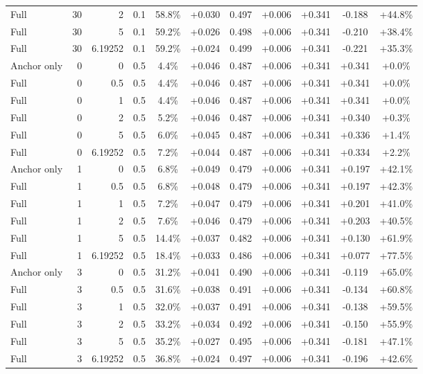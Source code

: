 \begin{table}[htbp]
\begin{tabular}{lrrrccccccc}
Full & 30 & 2 & 0.1 & 58.8\% & +0.030 & 0.497 & +0.006 & +0.341 & -0.188 & +44.8\% \\
Full & 30 & 5 & 0.1 & 59.2\% & +0.026 & 0.498 & +0.006 & +0.341 & -0.210 & +38.4\% \\
Full & 30 & 6.19252 & 0.1 & 59.2\% & +0.024 & 0.499 & +0.006 & +0.341 & -0.221 & +35.3\% \\
Anchor only & 0 & 0 & 0.5 & 4.4\% & +0.046 & 0.487 & +0.006 & +0.341 & +0.341 & +0.0\% \\
Full & 0 & 0.5 & 0.5 & 4.4\% & +0.046 & 0.487 & +0.006 & +0.341 & +0.341 & +0.0\% \\
Full & 0 & 1 & 0.5 & 4.4\% & +0.046 & 0.487 & +0.006 & +0.341 & +0.341 & +0.0\% \\
Full & 0 & 2 & 0.5 & 5.2\% & +0.046 & 0.487 & +0.006 & +0.341 & +0.340 & +0.3\% \\
Full & 0 & 5 & 0.5 & 6.0\% & +0.045 & 0.487 & +0.006 & +0.341 & +0.336 & +1.4\% \\
Full & 0 & 6.19252 & 0.5 & 7.2\% & +0.044 & 0.487 & +0.006 & +0.341 & +0.334 & +2.2\% \\
Anchor only & 1 & 0 & 0.5 & 6.8\% & +0.049 & 0.479 & +0.006 & +0.341 & +0.197 & +42.1\% \\
Full & 1 & 0.5 & 0.5 & 6.8\% & +0.048 & 0.479 & +0.006 & +0.341 & +0.197 & +42.3\% \\
Full & 1 & 1 & 0.5 & 7.2\% & +0.047 & 0.479 & +0.006 & +0.341 & +0.201 & +41.0\% \\
Full & 1 & 2 & 0.5 & 7.6\% & +0.046 & 0.479 & +0.006 & +0.341 & +0.203 & +40.5\% \\
Full & 1 & 5 & 0.5 & 14.4\% & +0.037 & 0.482 & +0.006 & +0.341 & +0.130 & +61.9\% \\
Full & 1 & 6.19252 & 0.5 & 18.4\% & +0.033 & 0.486 & +0.006 & +0.341 & +0.077 & +77.5\% \\
Anchor only & 3 & 0 & 0.5 & 31.2\% & +0.041 & 0.490 & +0.006 & +0.341 & -0.119 & +65.0\% \\
Full & 3 & 0.5 & 0.5 & 31.6\% & +0.038 & 0.491 & +0.006 & +0.341 & -0.134 & +60.8\% \\
Full & 3 & 1 & 0.5 & 32.0\% & +0.037 & 0.491 & +0.006 & +0.341 & -0.138 & +59.5\% \\
Full & 3 & 2 & 0.5 & 33.2\% & +0.034 & 0.492 & +0.006 & +0.341 & -0.150 & +55.9\% \\
Full & 3 & 5 & 0.5 & 35.2\% & +0.027 & 0.495 & +0.006 & +0.341 & -0.181 & +47.1\% \\
Full & 3 & 6.19252 & 0.5 & 36.8\% & +0.024 & 0.497 & +0.006 & +0.341 & -0.196 & +42.6\% \\

\end{tabular}
\end{table}
